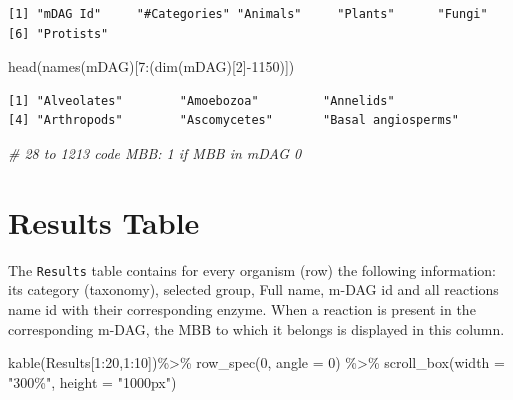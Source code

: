 \documentclass[
  letterpaper,
  DIV=11,
  numbers=noendperiod]{scrreprt}
\newenvironment{Shaded}{}{}
\newcommand{\AttributeTok}[1]{\textcolor[rgb]{0.78,0.47,0.87}{#1}}
\newcommand{\CommentTok}[1]{\textcolor[rgb]{0.36,0.39,0.44}{\textit{#1}}}
\newcommand{\DecValTok}[1]{\textcolor[rgb]{0.82,0.60,0.40}{#1}}
\newcommand{\FunctionTok}[1]{\textcolor[rgb]{0.38,0.69,0.94}{#1}}
\newcommand{\NormalTok}[1]{\textcolor[rgb]{0.67,0.70,0.75}{#1}}
\newcommand{\SpecialCharTok}[1]{\textcolor[rgb]{0.34,0.71,0.76}{#1}}
\newcommand{\StringTok}[1]{\textcolor[rgb]{0.60,0.76,0.47}{#1}}
\begin{document}
\begin{verbatim}
[1] "mDAG Id"     "#Categories" "Animals"     "Plants"      "Fungi"      
[6] "Protists"   
\end{verbatim}

\begin{Shaded}
\begin{Highlighting}[]
\FunctionTok{head}\NormalTok{(}\FunctionTok{names}\NormalTok{(mDAG)[}\DecValTok{7}\SpecialCharTok{:}\NormalTok{(}\FunctionTok{dim}\NormalTok{(mDAG)[}\DecValTok{2}\NormalTok{]}\SpecialCharTok{{-}}\DecValTok{1150}\NormalTok{)])}
\end{Highlighting}
\end{Shaded}

\begin{verbatim}
[1] "Alveolates"        "Amoebozoa"         "Annelids"         
[4] "Arthropods"        "Ascomycetes"       "Basal angiosperms"
\end{verbatim}

\begin{Shaded}
\begin{Highlighting}[]
\CommentTok{\# 28 to 1213  code MBB: 1 if MBB in mDAG 0}
\end{Highlighting}
\end{Shaded}

\section{Results Table}\label{results-table}

The \texttt{Results} table contains for every organism (row) the
following information: its category (taxonomy), selected group, Full
name, m-DAG id and all reactions name id with their corresponding
enzyme. When a reaction is present in the corresponding m-DAG, the MBB
to which it belongs is displayed in this column.

\begin{Shaded}
\begin{Highlighting}[]
\FunctionTok{kable}\NormalTok{(Results[}\DecValTok{1}\SpecialCharTok{:}\DecValTok{20}\NormalTok{,}\DecValTok{1}\SpecialCharTok{:}\DecValTok{10}\NormalTok{])}\SpecialCharTok{\%\textgreater{}\%}
  \FunctionTok{row\_spec}\NormalTok{(}\DecValTok{0}\NormalTok{, }\AttributeTok{angle =} \DecValTok{0}\NormalTok{) }\SpecialCharTok{\%\textgreater{}\%}   
  \FunctionTok{scroll\_box}\NormalTok{(}\AttributeTok{width =} \StringTok{"300\%"}\NormalTok{, }\AttributeTok{height =} \StringTok{"1000px"}\NormalTok{)}
\end{Highlighting}
\end{Shaded}
\end{document}
